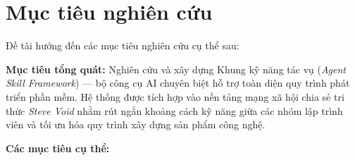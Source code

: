 \documentclass[13pt,a4paper,oneside]{extreport}
\numberwithin{equation}{chapter}
\numberwithin{figure}{chapter}
\numberwithin{table}{chapter}
\begin{document}
\section*{Mục tiêu nghiên cứu}

Đề tài hướng đến các mục tiêu nghiên cứu cụ thể sau:

\textbf{Mục tiêu tổng quát:} Nghiên cứu và xây dựng Khung kỹ năng tác vụ (\textit{Agent Skill Framework}) — bộ công cụ AI chuyên biệt hỗ trợ toàn diện quy trình phát triển phần mềm. Hệ thống được tích hợp vào nền tảng mạng xã hội chia sẻ tri thức \textit{Steve Void} nhằm rút ngắn khoảng cách kỹ năng giữa các nhóm lập trình viên và tối ưu hóa quy trình xây dựng sản phẩm công nghệ.

\textbf{Các mục tiêu cụ thể:}
\end{document}
